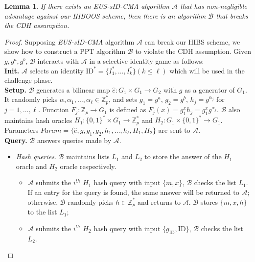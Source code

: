 \documentclass[times]{secauth}
\newtheorem{lemma}[theorem]{Lemma}
\theoremstyle{definition}
\theoremstyle{remark}
\begin{document}
\begin{lemma} \label{lemma-eus-hiboos}
If there exists an EUS-sID-CMA algorithm $\mathcal{A}$ that has non-negligible advantage against our HIBOOS scheme, 
then there is an algorithm $\mathcal{B}$ that breaks the CDH assumption.
\end{lemma}
\begin{proof}
Supposing \emph{EUS-sID-CMA} algorithm $\mathcal{A}$ can break our HIBS scheme, we show how to construct a PPT algorithm $\mathcal{B}$ to violate the CDH assumption. 
Given $g, g^a, g^b$, $\mathcal{B}$ interacts with $\mathcal{A}$ in a selective identity game as follows:
\vspace{0.2cm}
\\
\textbf{Init.} 
$\mathcal{A}$ selects an identity $\mathrm{ID}^* = \{I^*_1, \ldots, I^*_k\} (k \leqslant \ell)$ which will be used in the challenge phase.  
\vspace{0.2cm}
\\
\textbf{Setup.}
$\mathcal{B}$ generates a bilinear map $\hat{e}: G_1 \times G_1 \rightarrow G_2$ with $g$ as a generator of $G_1$.
It randomly picks $\alpha, \alpha_1, \ldots, \alpha_\ell \in \mathbb{Z}^*_p$, and sets $g_1 = g^a$, $g_2 = g^b$, $h_j =g^{\alpha_j}$ for $j = 1, \ldots, \ell$.
Function $F_j : \mathbb{Z}_p \rightarrow G_1$ is defined as $F_j(x)=g_1^xh_j =g_1^{x}g^{\alpha_j}$.
$\mathcal{B}$ also maintains hash oracles $H_1: \{0, 1\}^* \times G_1 \rightarrow \mathbb{Z}_p^*$ and $H_2: G_1 \times \{0, 1\}^* \rightarrow G_1$.
Parameters $Param = \{\hat{e}, g, g_1,  g_2, h_1, \ldots, h_\ell, H_1, H_2\}$ are sent to $\mathcal{A}$.
\vspace{0.2cm}
\\
\textbf{Query.}
$\mathcal{B}$ answers queries made by $\mathcal{A}$.
\begin{itemize}
	\item \emph{Hash queries}. 
	$\mathcal{B}$ maintains lists $L_1$ and $L_2$ to store the answer of the $H_1$ 		oracle and $H_2$ oracle respectively.
	\begin{itemize}
		\item $\mathcal{A}$ submits the $i^{th}$ $H_1$ hash query with input $\{m, x\}$, $\mathcal{B}$ checks the list $L_1$.
		If an entry for the query is found, the same answer will be returned to $\mathcal{A}$; otherwise, $\mathcal{B}$ randomly picks $h \in \mathbb{Z}_p^*$ and returns to $\mathcal{A}$.
		$\mathcal{B}$ stores $\{m, x, h\}$ to the list $L_1$;
		\item $\mathcal{A}$ submits the $i^{th}$ $H_2$ hash query with input $\{g_\mathrm{ID}, \mathrm{ID}\}$, $\mathcal{B}$ checks the list $L_2$. 

\end{itemize}
\end{itemize}
\end{proof}
\end{document}
